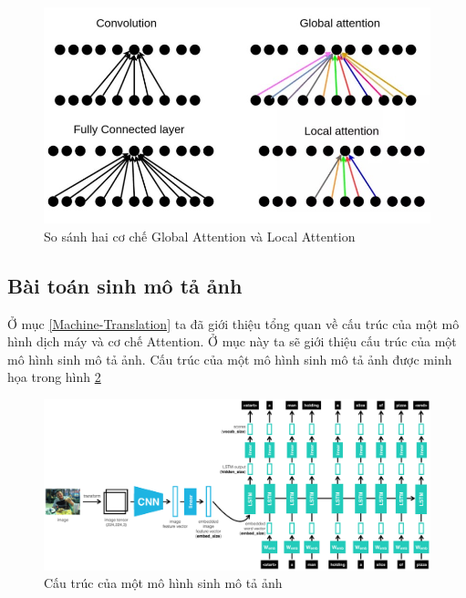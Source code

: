 \documentclass[14pt, a4paper]{article}
\numberwithin{equation}{section}
\numberwithin{algorithm}{section}
\numberwithin{figure}{section}
\numberwithin{dl}{section}
\numberwithin{md}{section}
\numberwithin{bd}{section}
\numberwithin{dn}{section}
\numberwithin{hq}{section}
\begin{document}
    \begin{figure}[h!] \centering

        \includegraphics[scale=0.4]{Local_Global_Attention.jpg}
        \caption{So sánh hai cơ chế Global Attention và Local Attention}
    
        \label{fig:Local_Global_Attention}
    \end{figure}

    \subsection{Bài toán sinh mô tả ảnh}

    Ở mục \ref{Machine-Translation} ta đã giới thiệu tổng quan về cấu trúc của một mô hình dịch máy và cơ chế Attention. 
    Ở mục này ta sẽ giới thiệu cấu trúc của một mô hình sinh mô tả ảnh. 
    Cấu trúc của một mô hình sinh mô tả ảnh được minh họa trong hình \ref{fig:Image_Captioning_Architecture}

    \begin{figure}[h!] \centering

        \includegraphics[scale=0.25]{Image_Captioning_Architecture.png}
        \caption{Cấu trúc của một mô hình sinh mô tả ảnh}
    
        \label{fig:Image_Captioning_Architecture}
    \end{figure}
\end{document}
